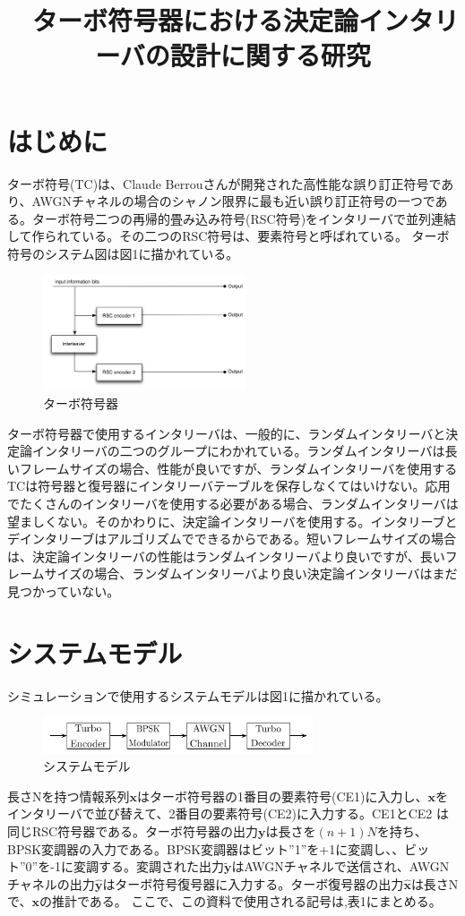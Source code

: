 \documentclass[twoside]{jsarticle}
\title{　ターボ符号器における決定論インタリーバの設計に関する研究}
\date{}
\begin{document}
\MKTITLE


\section{はじめに　}
ターボ符号(TC)は、Claude Berrouさんが開発された高性能な誤り訂正符号であり、AWGNチャネルの場合のシャノン限界に最も近い誤り訂正符号の一つである。ターボ符号二つの再帰的畳み込み符号(RSC符号)をインタリーバで並列連結して作られている。その二つのRSC符号は、要素符号と呼ばれている。
ターボ符号のシステム図は図1に描かれている。
\begin{figure}[h!]
\includegraphics[width=6cm]{TurboEncoderNew.jpg}
\caption{ターボ符号器}
\label{}
\end{figure}
ターボ符号器で使用するインタリーバは、一般的に、ランダムインタリーバと決定論インタリーバの二つのグループにわかれている。ランダムインタリーバは長いフレームサイズの場合、性能が良いですが、ランダムインタリーバを使用するTCは符号器と復号器にインタリーバテーブルを保存しなくてはいけない。応用でたくさんのインタリーバを使用する必要がある場合、ランダムインタリーバは望ましくない。そのかわりに、決定論インタリーバを使用する。インタリーブとデインタリーブはアルゴリズムでできるからである。短いフレームサイズの場合は、決定論インタリーバの性能はランダムインタリーバより良いですが、長いフレームサイズの場合、ランダムインタリーバより良い決定論インタリーバはまだ見つかっていない。%




\section{システムモデル　}
シミュレーションで使用するシステムモデルは図1に描かれている。
\begin{figure}[h!]
\includegraphics[width=8cm]{figure4.pdf}
\caption{システムモデル}
\label{}
\end{figure}
長さNを持つ情報系列$\mathbf{x}$はターボ符号器の1番目の要素符号(CE1)に入力し、$\mathbf{x}$をインタリーバで並び替えて、2番目の要素符号(CE2)に入力する。CE1とCE2 は同じRSC符号器である。ターボ符号器の出力$\mathbf{y}$は長さを$(n+1)N$を持ち、BPSK変調器の入力である。BPSK変調器はビット''1''を+1に変調し、、ビット''0''を-1に変調する。変調された出力$\mathbf{\widetilde{y}}$はAWGNチャネルで送信され、AWGNチャネルの出力$\mathbf{\widehat{y}}$はターボ符号復号器に入力する。ターボ復号器の出力$\mathbf{\widehat{x}}$は長さNで、$\mathbf{x}$の推計である。
ここで、この資料で使用される記号は,表1にまとめる。
\end{document}
